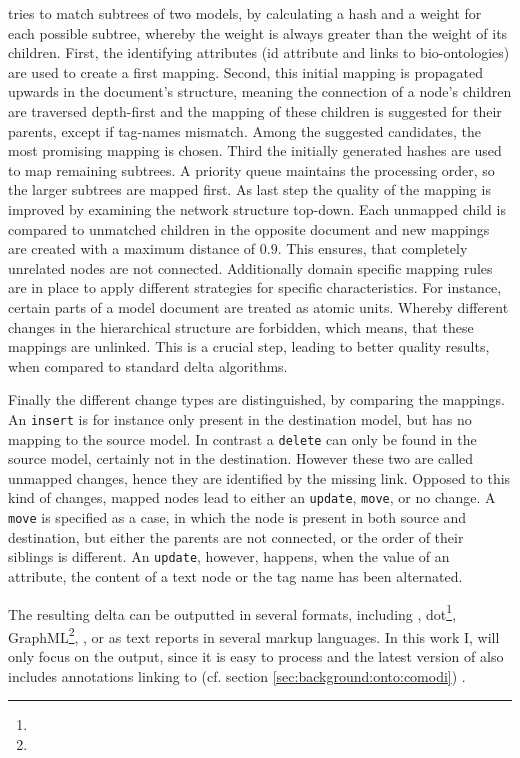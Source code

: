 	\bives tries to match subtrees of two models, by calculating a hash and a weight for each possible subtree, whereby the weight is always greater than the weight of its children.
	First, the identifying attributes (\xml id attribute and links to bio-ontologies) are used to create a first mapping. Second, this initial mapping is propagated upwards in the document's structure, meaning the connection of a node's children are traversed depth-first and the mapping of these children is suggested for their parents, except if tag-names mismatch. Among the suggested candidates, the most promising mapping is chosen.
	Third the initially generated hashes are used to map remaining subtrees. A priority queue maintains the processing order, so the larger subtrees are mapped first.
	As last step the quality of the mapping is improved by examining the network structure top-down. Each unmapped child is compared to unmatched children in the opposite document and new mappings are created with a maximum distance of $0.9$. This ensures, that completely unrelated nodes are not connected.
	Additionally domain specific mapping rules are in place to apply different strategies for specific characteristics. For instance, certain parts of a model document are treated as atomic units. Whereby different changes in the hierarchical structure are forbidden, which means, that these mappings are unlinked. This is a crucial step, leading to better quality results, when compared to standard \xml delta algorithms.
	
	Finally the different change types are distinguished, by comparing the mappings. An \texttt{insert} is for instance only present in the destination model, but has no mapping to the source model. In contrast a \texttt{delete} can only be found in the source model, certainly not in the destination.
	However these two are called unmapped changes, hence they are identified by the missing link. Opposed to this kind of changes, mapped nodes lead to either an \texttt{update}, \texttt{move}, or no change.
	A \texttt{move} is specified as a case, in which the node is present in both source and destination, but either the parents are not connected, or the order of their siblings is different. An \texttt{update}, however, happens, when the value of an attribute, the content of a text node or the tag name has been alternated.
	
	The resulting \xml delta can be outputted in several formats, including \xml, dot\footnote{}, GraphML\footnote{\todo{}}, \json, or as text reports in several markup languages.
	In this work I, will only focus on the \xml output, since it is easy to process and the latest version of \bives also includes \rdf annotations linking to \comodi (cf. section \ref{sec:background:onto:comodi}) \citep{Scharm2015}.
	
